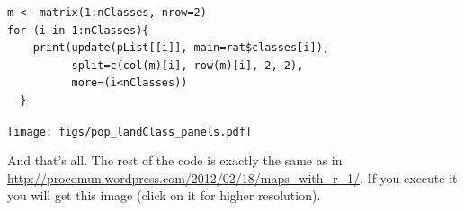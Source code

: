 \lstset{language=R}
\begin{lstlisting}
m <- matrix(1:nClasses, nrow=2)
for (i in 1:nClasses){
    print(update(pList[[i]], main=rat$classes[i]),
          split=c(col(m)[i], row(m)[i], 2, 2),
          more=(i<nClasses))
  }
\end{lstlisting}

\texttt{[image: figs/pop\_landClass\_panels.pdf]}

And that's all. The rest of the code is exactly the same as in \url{http://procomun.wordpress.com/2012/02/18/maps_with_r_1/}. If you execute it you will get this image (click on it
for higher resolution).





